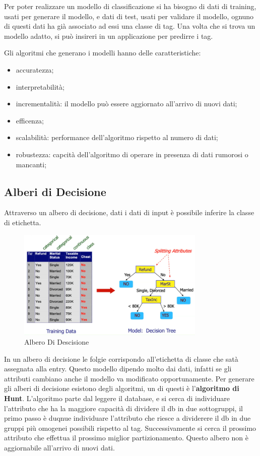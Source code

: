 \documentclass[12pt]{article}
\begin{document}
Per poter realizzare un modello di classificazione si ha bisogno di dati di training, usati per generare il modello, e dati di test, usati per validare il modello, ognuno di questi dati ha gi\`a associato ad essi una classe di tag. Una volta che si trova un modello adatto, si pu\`o insireri in un applicazione per predirre i tag.

Gli algoritmi che generano i modelli hanno delle caratteristiche:
\begin{itemize}
    \item accuratezza;
    \item interpretabilit\`a;
    \item incrementalit\`a: il modello pu\`o essere aggiornato all'arrivo di nuovi dati;
    \item efficenza;
    \item scalabilit\`a: performance dell'algoritmo rispetto al numero di dati;
    \item robustezza: capcit\`a dell'algoritmo di operare in presenza di dati rumorosi o mancanti;
\end{itemize}

\subsection{Alberi di Decisione}
Attraverso un albero di decisione, dati i dati di input \`e possibile inferire la classe di etichetta.
\begin{figure}[H]
    \centering
    \includegraphics[width=0.8\textwidth]{albero-di-descisione.png}
    \caption{Albero Di Descisione}
    \label{fig:albero-di-descisione}
\end{figure}
In un albero di decisione le folgie corrispondo all'etichetta di classe che sat\`a assegnata alla entry. Questo modello dipendo molto dai dati, infatti se gli attributi cambiano anche il modello va modificato opportunamente. Per generare gli alberi di decisione esistono degli algoritmi, un di questi \`e l'\textbf{algoritmo di Hunt}. L'algoritmo parte dal leggere il database, e si cerca di  individuare l'attributo che ha la maggiore capacit\`a di dividere il db in due sottogruppi, il primo passo \`e duqnue individuare l'attributo che riesce a dividerere il db in due gruppi pi\`u omogenei possibili rispetto al tag. Successivamente si cerca il prossimo attributo che effettua il prossimo miglior partizionamento. Questo albero non \`e aggiornabile all'arrivo di nuovi dati.
\end{document}
